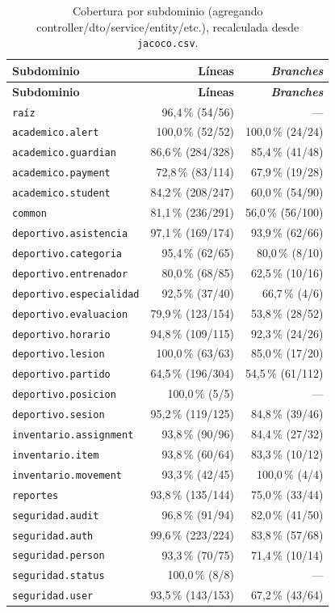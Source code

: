 \documentclass[11pt,a4paper]{article}
\newcommand{\ruta}[1]{\texttt{\footnotesize #1}}
\begin{document}
\begin{longtable}{@{}lrr@{}}
\caption{Cobertura por subdominio (agregando controller/dto/service/entity/etc.), recalculada desde \ruta{jacoco.csv}.\label{tab:cobertura-por-paquete}}\\
\toprule
\textbf{Subdominio} & \textbf{Líneas} & \textbf{\emph{Branches}} \\
\midrule
\endfirsthead
\toprule
\textbf{Subdominio} & \textbf{Líneas} & \textbf{\emph{Branches}} \\
\midrule
\endhead
\texttt{raíz} & 96,4\,\% (54/56) & --- \\
\texttt{academico.alert} & 100,0\,\% (52/52) & 100,0\,\% (24/24) \\
\texttt{academico.guardian} & 86,6\,\% (284/328) & 85,4\,\% (41/48) \\
\texttt{academico.payment} & 72,8\,\% (83/114) & 67,9\,\% (19/28) \\
\texttt{academico.student} & 84,2\,\% (208/247) & 60,0\,\% (54/90) \\
\texttt{common} & 81,1\,\% (236/291) & 56,0\,\% (56/100) \\
\texttt{deportivo.asistencia} & 97,1\,\% (169/174) & 93,9\,\% (62/66) \\
\texttt{deportivo.categoria} & 95,4\,\% (62/65) & 80,0\,\% (8/10) \\
\texttt{deportivo.entrenador} & 80,0\,\% (68/85) & 62,5\,\% (10/16) \\
\texttt{deportivo.especialidad} & 92,5\,\% (37/40) & 66,7\,\% (4/6) \\
\texttt{deportivo.evaluacion} & 79,9\,\% (123/154) & 53,8\,\% (28/52) \\
\texttt{deportivo.horario} & 94,8\,\% (109/115) & 92,3\,\% (24/26) \\
\texttt{deportivo.lesion} & 100,0\,\% (63/63) & 85,0\,\% (17/20) \\
\texttt{deportivo.partido} & 64,5\,\% (196/304) & 54,5\,\% (61/112) \\
\texttt{deportivo.posicion} & 100,0\,\% (5/5) & --- \\
\texttt{deportivo.sesion} & 95,2\,\% (119/125) & 84,8\,\% (39/46) \\
\texttt{inventario.assignment} & 93,8\,\% (90/96) & 84,4\,\% (27/32) \\
\texttt{inventario.item} & 93,8\,\% (60/64) & 83,3\,\% (10/12) \\
\texttt{inventario.movement} & 93,3\,\% (42/45) & 100,0\,\% (4/4) \\
\texttt{reportes} & 93,8\,\% (135/144) & 75,0\,\% (33/44) \\
\texttt{seguridad.audit} & 96,8\,\% (91/94) & 82,0\,\% (41/50) \\
\texttt{seguridad.auth} & 99,6\,\% (223/224) & 83,8\,\% (57/68) \\
\texttt{seguridad.person} & 93,3\,\% (70/75) & 71,4\,\% (10/14) \\
\texttt{seguridad.status} & 100,0\,\% (8/8) & --- \\
\texttt{seguridad.user} & 93,5\,\% (143/153) & 67,2\,\% (43/64) \\
\bottomrule
\end{longtable}
\end{document}
